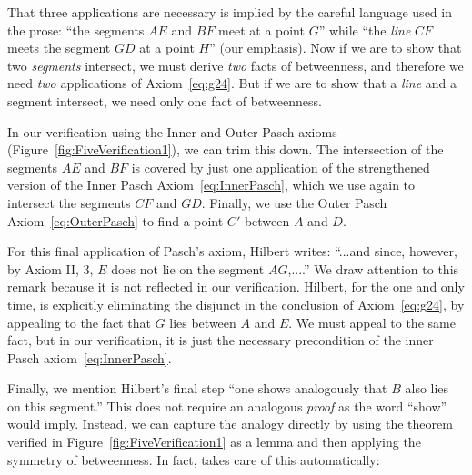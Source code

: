 That three applications are necessary is implied by the careful language used in the prose: ``the segments $AE$ and $BF$ meet at a point $G$'' while ``the \emph{line} $CF$ meets the segment $GD$ at a point $H$'' (our emphasis). Now if we are to show that two \emph{segments} intersect, we must derive \emph{two} facts of betweenness, and therefore we need \emph{two} applications of Axiom~\ref{eq:g24}. But if we are to show that a \emph{line} and a segment intersect, we need only one fact of betweenness. 

In our verification using the Inner and Outer Pasch axioms (Figure~\ref{fig:FiveVerification1}), we can trim this down. The intersection of the segments $AE$ and $BF$ is covered by just one application of the strengthened version of the Inner Pasch Axiom~\eqref{eq:InnerPasch}, which we use again to intersect the segments $CF$ and $GD$. Finally, we use the Outer Pasch Axiom~\eqref{eq:OuterPasch} to find a point $C'$ between $A$ and $D$. 

For this final application of Pasch's axiom, Hilbert writes: ``...and since, however, by Axiom II, 3, $E$ does not lie on the segment $AG$,....'' We draw attention to this remark because it is not reflected in our verification. Hilbert, for the one and only time, is explicitly eliminating the disjunct in the conclusion of Axiom~\ref{eq:g24}, by appealing to the fact that $G$ lies between $A$ and $E$. We must appeal to the same fact, but in our verification, it is just the necessary precondition of the inner  Pasch axiom~\eqref{eq:InnerPasch}.

Finally, we mention Hilbert's final step ``one shows analogously that $B$ also lies on this segment.'' This does not require an analogous \emph{proof} as the word ``show'' would imply. Instead, we can capture the analogy directly by using the theorem verified in Figure~\ref{fig:FiveVerification1} as a lemma and then applying the symmetry of betweenness. In fact,  takes care of this automatically:

\linebreak

